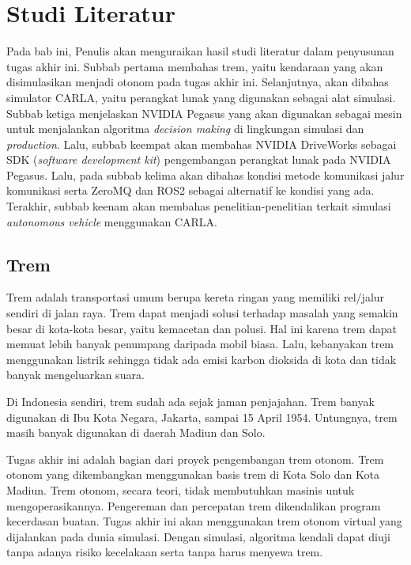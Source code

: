 \chapter{Studi Literatur}

Pada bab ini, Penulis akan menguraikan hasil studi literatur dalam penyusunan
tugas akhir ini. Subbab pertama membahas trem, yaitu kendaraan yang akan
disimulasikan menjadi otonom pada tugas akhir ini. Selanjutnya, akan dibahas
simulator CARLA, yaitu perangkat lunak yang digunakan sebagai alat simulasi.
Subbab ketiga menjelaskan NVIDIA Pegasus yang akan digunakan sebagai mesin untuk
menjalankan algoritma \textit{decision making} di lingkungan simulasi dan
\textit{production}. Lalu, subbab keempat akan membahas NVIDIA DriveWorks
sebagai SDK (\textit{software development kit}) pengembangan perangkat lunak
pada NVIDIA Pegasus. Lalu, pada subbab kelima akan dibahas kondisi metode
komunikasi jalur komunikasi serta ZeroMQ dan ROS2 sebagai alternatif ke kondisi
yang ada. Terakhir, subbab keenam akan membahas penelitian-penelitian terkait
simulasi \textit{autonomous vehicle} menggunakan CARLA.

\section{Trem}

Trem adalah transportasi umum berupa kereta ringan yang memiliki rel/jalur
sendiri di jalan raya. Trem dapat menjadi solusi terhadap masalah yang semakin
besar di kota-kota besar, yaitu kemacetan dan polusi. Hal ini karena trem dapat
memuat lebih banyak penumpang daripada mobil biasa. Lalu, kebanyakan trem
menggunakan listrik sehingga tidak ada emisi karbon dioksida di kota dan tidak
banyak mengeluarkan suara.

Di Indonesia sendiri, trem sudah ada sejak jaman penjajahan. Trem banyak
digunakan di Ibu Kota Negara, Jakarta, sampai 15 April 1954. Untungnya, trem
masih banyak digunakan di daerah Madiun dan Solo.

Tugas akhir ini adalah bagian dari proyek pengembangan trem otonom. Trem otonom
yang dikembangkan menggunakan basis trem di Kota Solo dan Kota Madiun. Trem
otonom, secara teori, tidak membutuhkan masinis untuk mengoperasikannya.
Pengereman dan percepatan trem dikendalikan program kecerdasan buatan. Tugas
akhir ini akan menggunakan trem otonom virtual yang dijalankan pada dunia
simulasi. Dengan simulasi, algoritma kendali dapat diuji tanpa adanya risiko
kecelakaan serta tanpa harus menyewa trem.

